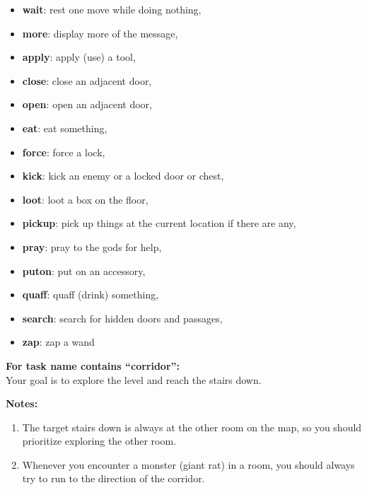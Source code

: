 \begin{MyGreenBox}
\begin{itemize}
		\item \textbf{wait}: rest one move while doing nothing,

		\item \textbf{more}: display more of the message,

		\item \textbf{apply}: apply (use) a tool,

		\item \textbf{close}: close an adjacent door,

		\item \textbf{open}: open an adjacent door,

		\item \textbf{eat}: eat something,

		\item \textbf{force}: force a lock,

		\item \textbf{kick}: kick an enemy or a locked door or chest,

		\item \textbf{loot}: loot a box on the floor,

		\item \textbf{pickup}: pick up things at the current location if there are any,

		\item \textbf{pray}: pray to the gods for help,

		\item \textbf{puton}: put on an accessory,

		\item \textbf{quaff}: quaff (drink) something,

		\item \textbf{search}: search for hidden doors and passages,

		\item \textbf{zap}: zap a wand
	\end{itemize}

	\textbf{For task name contains “corridor”:}\\ Your goal is to explore the
	level and reach the stairs down.

	\textbf{Notes:}
	\begin{enumerate}
		\item The target stairs down is always at the other room on the map, so you
			should prioritize exploring the other room.

		\item Whenever you encounter a monster (giant rat) in a room, you should
			always try to run to the direction of the corridor.


\end{enumerate}
\end{MyGreenBox}
